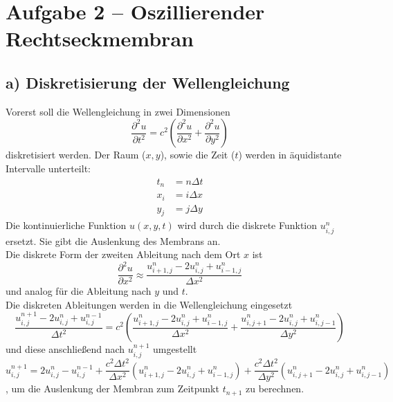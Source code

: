\section{Aufgabe 2 – Oszillierender Rechtseckmembran}
\subsection{a) Diskretisierung der Wellengleichung}
Vorerst soll die Wellengleichung in zwei Dimensionen
\begin{equation}
    \label{eqn:wave2d}
    \frac{\partial^2 u}{\partial t^2} = c^2 \left( \frac{\partial^2 u}{\partial x^2} + \frac{\partial^2 u}{\partial y^2} \right)
\end{equation}
diskretisiert werden.
Der Raum ($x, y$), sowie die Zeit ($t$) werden in äquidistante Intervalle unterteilt:
\begin{align}
    t_n &= n \Delta t \\
    x_i &= i \Delta x \\
    y_j &= j \Delta y
\end{align}
Die kontinuierliche Funktion $u(x, y, t)$ wird durch die diskrete Funktion $u_{i,j}^n$ ersetzt.
Sie gibt die Auslenkung des Membrans an.
\\
Die diskrete Form der zweiten Ableitung nach dem Ort $x$ ist
\begin{equation}
    \frac{\partial^2 u}{\partial x^2} \approx \frac{u_{i+1,j}^n - 2 u_{i,j}^n + u_{i-1,j}^n}{\Delta x ^2}
\end{equation}
und analog für die Ableitung nach $y$ und $t$.
\\
Die diskreten Ableitungen werden in die Wellengleichung eingesetzt
\begin{equation*}
    \frac{u_{i,j}^{n+1} - 2 u_{i,j}^n + u_{i,j}^{n-1}}{\Delta t^2} = c^2 \left( \frac{u_{i+1,j}^n - 2 u_{i,j}^n + u_{i-1,j}^n}{\Delta x ^2} + \frac{u_{i,j+1}^n - 2 u_{i,j}^n + u_{i,j-1}^n}{\Delta y ^2} \right)
\end{equation*}
und diese anschließend nach $u_{i,j}^{n+1}$ umgestellt
\begin{equation}
    u_{i,j}^{n+1} = 2 u_{i,j}^n - u_{i,j}^{n-1} + \frac{c^2 \Delta t^2}{\Delta x^2} \left( u_{i+1,j}^n - 2 u_{i,j}^n + u_{i-1,j}^n \right) + \frac{c^2 \Delta t^2}{\Delta y^2} \left( u_{i,j+1}^n - 2 u_{i,j}^n + u_{i,j-1}^n \right)
    \label{eqn:discretewave}
\end{equation}
, um die Auslenkung der Membran zum Zeitpunkt $t_{n+1}$ zu berechnen.

